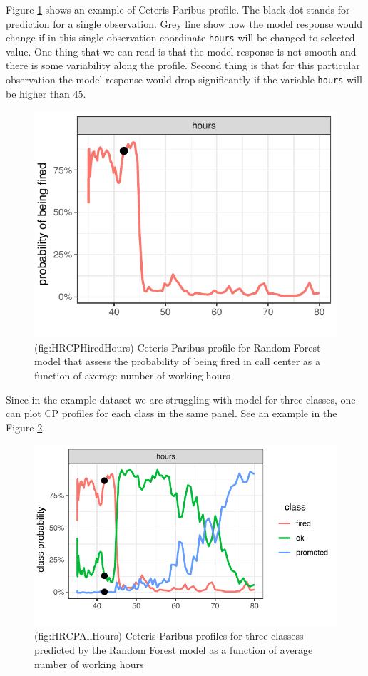 \documentclass[]{krantz}
\theoremstyle{definition}
\theoremstyle{definition}
\theoremstyle{definition}
\theoremstyle{remark}
\begin{document}
Figure \ref{fig:HRCPFiredHours} shows an example of Ceteris Paribus
profile. The black dot stands for prediction for a single observation.
Grey line show how the model response would change if in this single
observation coordinate \texttt{hours} will be changed to selected value.
One thing that we can read is that the model response is not smooth and
there is some variability along the profile. Second thing is that for
this particular observation the model response would drop significantly
if the variable \texttt{hours} will be higher than 45.

\begin{figure}

{\centering \includegraphics[width=0.5\linewidth]{figure/HR_cp_fired_hours} 

}

\caption{(fig:HRCPHiredHours) Ceteris Paribus profile for Random Forest model that assess the probability of being fired in call center as a function of average number of working hours}\label{fig:HRCPFiredHours}
\end{figure}

Since in the example dataset we are struggling with model for three
classes, one can plot CP profiles for each class in the same panel. See
an example in the Figure \ref{fig:HRCPAllHours}.

\begin{figure}

{\centering \includegraphics[width=0.6\linewidth]{figure/HR_cp_all_hours} 

}

\caption{(fig:HRCPAllHours) Ceteris Paribus profiles for three classess predicted by the Random Forest model as a function of average number of working hours}\label{fig:HRCPAllHours}
\end{figure}
\end{document}
